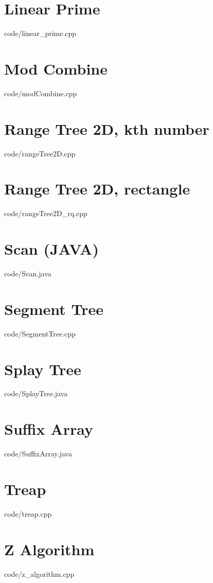 \documentclass [10pt,a4paper,twocolumn]{article}
\begin{document}
\section{Linear Prime}
 {code/linear_prime.cpp}
\section{Mod Combine}
 {code/modCombine.cpp}
\section{Range Tree 2D, kth number}
 {code/rangeTree2D.cpp}
\section{Range Tree 2D, rectangle}
 {code/rangeTree2D_rq.cpp}
\section{Scan (JAVA)}
 {code/Scan.java}
\section{Segment Tree}
 {code/SegmentTree.cpp}
\section{Splay Tree}
 {code/SplayTree.java}
\section{Suffix Array}
 {code/SuffixArray.java}
\section{Treap}
 {code/treap.cpp}
\section{Z Algorithm}
 {code/z_algorithm.cpp}
\end{document}
